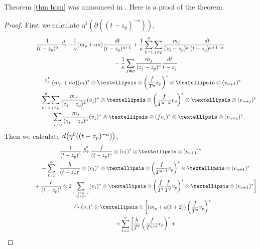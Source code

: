\documentclass[11pt]{article}
\numberwithin{equation}{section}
\begin{document}
Theorem \ref{thm hom} was announced in \cite{SV2}. Here is a proof of the theorem.

\begin{proof} First we calculate $ \eta^1(\partial((t-z_p)^{-a}))$,
\begin{gather*}
\frac 1{(t-z_p)^{a}} \overset{\partial} \mapsto -\frac{1}{\kappa}(m_p+a\kappa) \frac{{\rm d}t}{(t-z_p)^{a+1}} +\frac{1}{\kappa} \sum_{k=1}^a \sum_{j\neq p}\frac{m_j}{(z_j-z_p)^k}
\frac{{\rm d}t}{(t-z_p)^{a+1-k}} \nonumber \\
\hphantom{\frac 1{(t-z_p)^{a}} \overset{\partial} \mapsto}{} - \frac{1}{\kappa} \sum_{j\neq p} \frac{m_j}{(z_j-z_p)^a}\frac{{\rm d}t}{t-z_j} \nonumber \\
\hphantom{\frac 1{(t-z_p)^{a}}}{}\overset{\eta^1} \mapsto (m_p+\kappa a) (v_1)^* \otimes\dots\otimes\left(\frac{f}{T^a}v_p \right)^* \otimes\dots\otimes (v_{n+1})^* \nonumber \\
\hphantom{\frac 1{(t-z_p)^{a}} \overset{\partial} \mapsto}{} - \sum_{k=1}^a \sum_{j \neq p}\frac{ m_j}{(z_j-z_p)^k} (v_1)^* \otimes\dots\otimes \left(\frac{f}{T^{a-k}} v_p \right)^* \otimes\dots\otimes (v_{n+1})^* \nonumber\\
\hphantom{\frac 1{(t-z_p)^{a}} \overset{\partial} \mapsto}{} + \sum_{j\neq p}\frac{ m_j}{(z_j-z_p)^a} (v_1)^* \otimes\dots\otimes (fv_j)^* \otimes\dots\otimes (v_{n+1})^*. \nonumber
\end{gather*}
Then we calculate ${\rm d}\big(\eta^0((t-z_p)^{-a})\big)$,
\begin{gather*}
\frac1{(t-z_p)^{a}} \overset{\eta^0}\mapsto \frac{f}{(t-z_p)^a} \otimes (v_1)^* \otimes\dots\otimes (v_{n+1})^* \nonumber \\
\hphantom{\frac1{(t-z_p)^{a}} \overset{\eta^0}\mapsto}{} - \sum_{l=1}^a \bigg[ \frac{h}{(t-z_p)^l} \otimes (v_1)^* \otimes\dots\otimes \left( \frac{f}{T^{a-l}} v_p \right)^* \otimes\dots\otimes (v_{n+1})^*
\nonumber \\
\hphantom{\frac1{(t-z_p)^{a}} \overset{\eta^0}\mapsto}{} + \frac{e}{(t-z_p)^l} \otimes 2 \sum_{i+j = a-l \atop i \geq j \geq 0} (v_1)^* \otimes\dots\otimes \left(\frac{f}{T^i} \frac{f}{T^j} v_p \right)^* \otimes\dots\otimes (v_{n+1})^* \bigg] \nonumber \\
\hphantom{\frac1{(t-z_p)^{a}}}{}
\overset{\mu} \mapsto (v_1)^* \otimes\dots\otimes \bigg[ (m_p + a(k+2)) \left(\frac{f}{T^a} v_p \right)^* \nonumber \\
\hphantom{\frac1{(t-z_p)^{a}} \overset{\eta^0}\mapsto}{} + \sum_{l=1}^a \bigg[\frac{h}{T^l}\left(\frac{f}{T^{a-l}}v_p\right)^*+

\end{gather*}
\end{proof}
\end{document}
